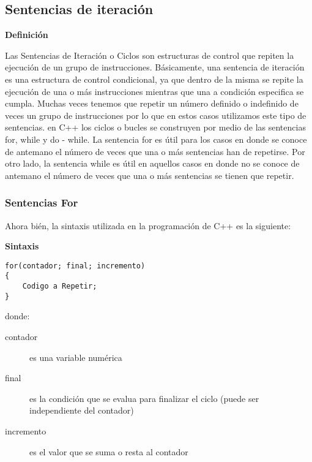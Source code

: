 \subsection{Sentencias de iteración}

\begin{center}
	\textbf{Definición}
\end{center}

Las Sentencias de Iteración o Ciclos son estructuras de control que repiten la ejecución de un grupo de instrucciones. Básicamente, una sentencia de iteración es una estructura de control condicional, ya que dentro de la misma se repite la ejecución de una o más instrucciones mientras que una a condición especifica se cumpla. Muchas veces tenemos que repetir un número definido o indefinido de veces un grupo de instrucciones por lo que en estos casos utilizamos este tipo de sentencias. en C++ los ciclos o bucles se construyen por medio de las sentencias for, while y do - while. La sentencia for es útil para los casos en donde se conoce de antemano el número de veces que una o más sentencias han de repetirse. Por otro lado, la sentencia while es útil en aquellos casos en donde no se conoce de antemano el número de veces que una o más sentencias se tienen que repetir.

\subsubsection{Sentencias For}

Ahora bién, la sintaxis utilizada en la programación de C++ es la siguiente:

\begin{center}
	\textbf{Sintaxis}
\end{center}

\begin{lstlisting}[style=Cpp, label=sintaxis-for, caption=Sintaxis For]
for(contador; final; incremento)
{
    Codigo a Repetir;
}
\end{lstlisting}

donde:

\begin{description}
\item [contador] es una variable numérica
\item [final] es la condición que se evalua para finalizar el ciclo (puede ser independiente del contador)
\item [incremento] es el valor que se suma o resta al contador
\end{description}

